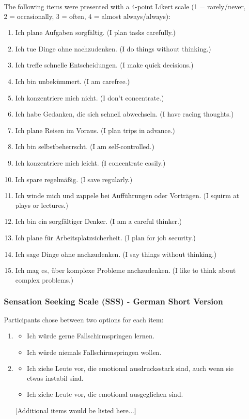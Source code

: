 The following items were presented with a 4-point Likert scale (1 = rarely/never, 2 = occasionally, 3 = often, 4 = almost always/always):

\begin{enumerate}
\item Ich plane Aufgaben sorgfältig. (I plan tasks carefully.)
\item Ich tue Dinge ohne nachzudenken. (I do things without thinking.)
\item Ich treffe schnelle Entscheidungen. (I make quick decisions.)
\item Ich bin unbekümmert. (I am carefree.)
\item Ich konzentriere mich nicht. (I don't concentrate.)
\item Ich habe Gedanken, die sich schnell abwechseln. (I have racing thoughts.)
\item Ich plane Reisen im Voraus. (I plan trips in advance.)
\item Ich bin selbstbeherrscht. (I am self-controlled.)
\item Ich konzentriere mich leicht. (I concentrate easily.)
\item Ich spare regelmäßig. (I save regularly.)
\item Ich winde mich und zappele bei Aufführungen oder Vorträgen. (I squirm at plays or lectures.)
\item Ich bin ein sorgfältiger Denker. (I am a careful thinker.)
\item Ich plane für Arbeitsplatzsicherheit. (I plan for job security.)
\item Ich sage Dinge ohne nachzudenken. (I say things without thinking.)
\item Ich mag es, über komplexe Probleme nachzudenken. (I like to think about complex problems.)
\end{enumerate}

\subsubsection{Sensation Seeking Scale (SSS) - German Short Version}

Participants chose between two options for each item:

\begin{enumerate}
\item 
\begin{itemize}
\item[A] Ich würde gerne Fallschirmspringen lernen.
\item[B] Ich würde niemals Fallschirmspringen wollen.
\end{itemize}

\item 
\begin{itemize}
\item[A] Ich ziehe Leute vor, die emotional ausdrucksstark sind, auch wenn sie etwas instabil sind.
\item[B] Ich ziehe Leute vor, die emotional ausgeglichen sind.
\end{itemize}

[Additional items would be listed here...]
\end{enumerate}

